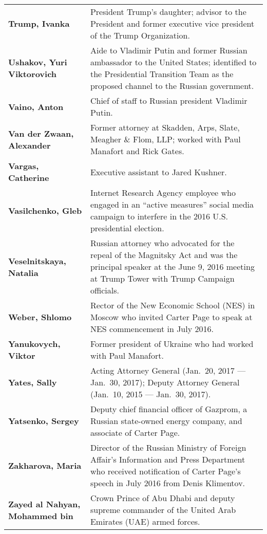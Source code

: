 \begin{longtable}{ p{} p{} }
    \textbf{Trump, Ivanka} & President Trump’s daughter; advisor to the President and former executive vice president of the Trump Organization. \\

    \textbf{Ushakov, Yuri Viktorovich} & Aide to Vladimir Putin and former Russian ambassador to the United States; identified to the Presidential Transition Team as the proposed channel to the Russian government. \\

    \textbf{Vaino, Anton} & Chief of staff to Russian president Vladimir Putin. \\

    \textbf{Van der Zwaan, Alexander} & Former attorney at Skadden, Arps, Slate, Meagher \& Flom, LLP; worked with Paul Manafort and Rick Gates. \\

    \textbf{Vargas, Catherine} & Executive assistant to Jared Kushner. \\

    \textbf{Vasilchenko, Gleb} & Internet Research Agency employee who engaged in an “active measures” social media campaign to interfere in the 2016 U.S. presidential election. \\

    \textbf{Veselnitskaya, Natalia} & Russian attorney who advocated for the repeal of the Magnitsky Act and was the principal speaker at the June 9, 2016 meeting at Trump Tower with Trump Campaign officials. \\

    \textbf{Weber, Shlomo} & Rector of the New Economic School (NES) in Moscow who invited Carter Page to speak at NES commencement in July 2016. \\

    \textbf{Yanukovych, Viktor} & Former president of Ukraine who had worked with Paul Manafort. \\

    \textbf{Yates, Sally} & Acting Attorney General (Jan.~20, 2017 — Jan.~30, 2017); Deputy Attorney General (Jan.~10, 2015 — Jan.~30, 2017). \\

    \textbf{Yatsenko, Sergey} & Deputy chief financial officer of Gazprom, a Russian state-owned energy company, and associate of Carter Page. \\

    \textbf{Zakharova, Maria} & Director of the Russian Ministry of Foreign Affair’s Information and Press Department who received notification of Carter Page’s speech in July 2016 from Denis Klimentov. \\

    \textbf{Zayed al Nahyan, Mohammed bin} & Crown Prince of Abu Dhabi and deputy supreme commander of the United Arab Emirates (UAE) armed forces.

\end{longtable}

